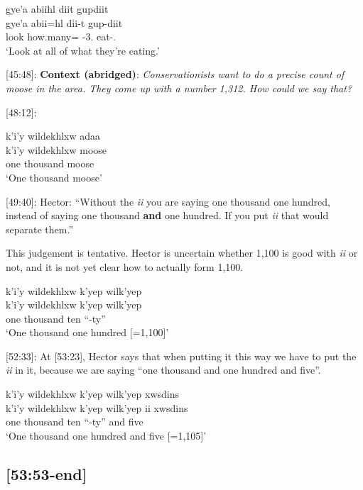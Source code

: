 \documentclass{article}
\newcommand{\tsb}{\textsubbar} %
\begin{document}
\begin{exe}
    \ex \glll gye'a \tsb{g}abiihl diit gupdiit \\
    gye'a \tsb{g}abii=hl dii-t gup-diit \\
    look how.many=\Cn{} \Foc{}-\textsc{3}.\I{} eat-\Tpl{}.\Ii{}\\
    `Look at all of what they're eating.'
\end{exe}


[45:48]: \textbf{Context (abridged)}: \textit{Conservationists want to do a precise count of moose in the area. They come up with a number 1,312. How could we say that?}

[48:12]:

\begin{exe}
    \ex \glll k'i'y wildekhlxw \tsb{x}adaa \\
    k'i'y wildekhlxw moose \\
    one thousand moose\\
    `One thousand moose'
\end{exe}

[49:40]: Hector: ``Without the \textit{ii} you are saying one thousand one hundred, instead of saying one thousand \textbf{and} one hundred. If you put \textit{ii} that would separate them.''

This judgement is tentative. Hector is uncertain whether 1,100 is good with \textit{ii} or not, and it is not yet clear how to actually form 1,100.


\begin{exe}
    \ex \glll k'i'y wildekhlxw k'yep wilk'yep \\
    k'i'y wildekhlxw k'yep wilk'yep \\
    one thousand ten ``-ty''\\
    `One thousand one hundred [=1,100]'
\end{exe}

[52:33]: At [53:23], Hector says that when putting it this way we have to put the \textit{ii} in it, because we are saying ``one thousand and one hundred and five''.
\begin{exe}
    \ex \glll k'i'y wildekhlxw k'yep wilk'yep xwsdins \\
    k'i'y wildekhlxw k'yep wilk'yep ii xwsdins \\
    one thousand ten ``-ty'' and five\\
    `One thousand one hundred and five [=1,105]'
\end{exe}

\subsection{[53:53-end]}
\end{document}
